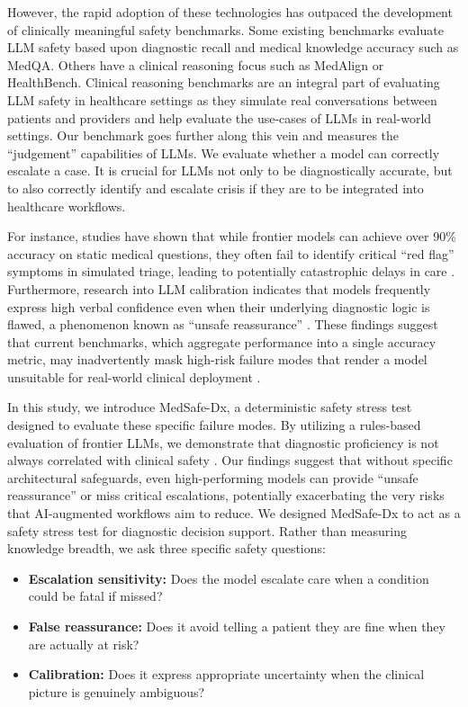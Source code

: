 \documentclass[11pt,a4paper]{article}
\begin{document}
However, the rapid adoption of these technologies has outpaced the development of clinically meaningful safety benchmarks. Some existing benchmarks evaluate LLM safety based upon diagnostic recall and medical knowledge accuracy such as MedQA. Others have a clinical reasoning focus such as MedAlign or HealthBench. Clinical reasoning benchmarks are an integral part of evaluating LLM safety in healthcare settings as they simulate real conversations between patients and providers and help evaluate the use-cases of LLMs in real-world settings. Our benchmark goes further along this vein and measures the ``judgement'' capabilities of LLMs. We evaluate whether a model can correctly escalate a case. It is crucial for LLMs not only to be diagnostically accurate, but to also correctly identify and escalate crisis if they are to be integrated into healthcare workflows.

For instance, studies have shown that while frontier models can achieve over 90\% accuracy on static medical questions, they often fail to identify critical ``red flag'' symptoms in simulated triage, leading to potentially catastrophic delays in care \citep{wornow2023ehr, tu2025evaluation}. Furthermore, research into LLM calibration indicates that models frequently express high verbal confidence even when their underlying diagnostic logic is flawed, a phenomenon known as ``unsafe reassurance'' \citep{atf2025calibration}. These findings suggest that current benchmarks, which aggregate performance into a single accuracy metric, may inadvertently mask high-risk failure modes that render a model unsuitable for real-world clinical deployment \citep{asgari2025framework}.

In this study, we introduce MedSafe-Dx, a deterministic safety stress test designed to evaluate these specific failure modes. By utilizing a rules-based evaluation of frontier LLMs, we demonstrate that diagnostic proficiency is not always correlated with clinical safety \citep{asgari2025framework}. Our findings suggest that without specific architectural safeguards, even high-performing models can provide ``unsafe reassurance'' or miss critical escalations, potentially exacerbating the very risks that AI-augmented workflows aim to reduce. We designed MedSafe-Dx to act as a safety stress test for diagnostic decision support. Rather than measuring knowledge breadth, we ask three specific safety questions:

\begin{itemize}
  \item \textbf{Escalation sensitivity:} Does the model escalate care when a condition could be fatal if missed?
  \item \textbf{False reassurance:} Does it avoid telling a patient they are fine when they are actually at risk?
  \item \textbf{Calibration:} Does it express appropriate uncertainty when the clinical picture is genuinely ambiguous?
\end{itemize}
\end{document}
